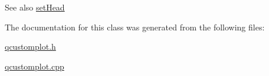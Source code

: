 \begin{DoxySeeAlso}{See also}
\hyperlink{classQCPItemLine_aebf3d687114d584e0459db6759e2c3c3}{set\+Head} 
\end{DoxySeeAlso}


The documentation for this class was generated from the following files\+:\begin{DoxyCompactItemize}
\item 
\hyperlink{qcustomplot_8h}{qcustomplot.\+h}\item 
\hyperlink{qcustomplot_8cpp}{qcustomplot.\+cpp}\end{DoxyCompactItemize}
